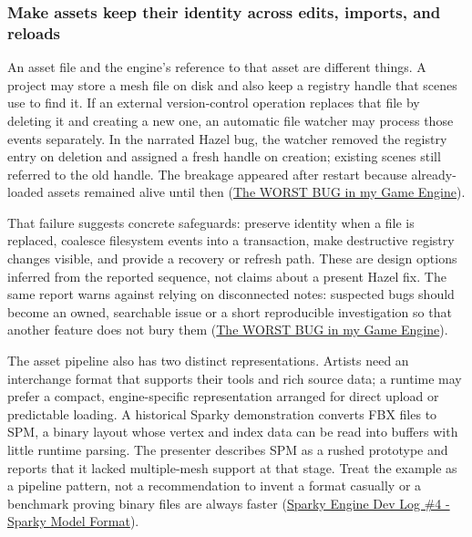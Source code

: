 \subsubsection{Make assets keep their identity across edits, imports, and reloads}\label{06-engine-ii-ch041-make-assets-keep-their-identity-across-edits-imports-and-reloads}

\hypertarget{06-engine-ii-ch041-make-assets-keep-their-identity-across-edits-imports-and-reloads}{}

An asset file and the engine's reference to that asset are different things. A project may store a mesh file on disk and also keep a registry handle that scenes use to find it. If an external version-control operation replaces that file by deleting it and creating a new one, an automatic file watcher may process those events separately. In the narrated Hazel bug, the watcher removed the registry entry on deletion and assigned a fresh handle on creation; existing scenes still referred to the old handle. The breakage appeared after restart because already-loaded assets remained alive until then (\href{https://www.youtube.com/watch?v=x5dy8T9dRPk&t=0m3s}{The WORST BUG in my Game Engine}).

That failure suggests concrete safeguards: preserve identity when a file is replaced, coalesce filesystem events into a transaction, make destructive registry changes visible, and provide a recovery or refresh path. These are design options inferred from the reported sequence, not claims about a present Hazel fix. The same report warns against relying on disconnected notes: suspected bugs should become an owned, searchable issue or a short reproducible investigation so that another feature does not bury them (\href{https://www.youtube.com/watch?v=x5dy8T9dRPk&t=4m55s}{The WORST BUG in my Game Engine}).

The asset pipeline also has two distinct representations. Artists need an interchange format that supports their tools and rich source data; a runtime may prefer a compact, engine-specific representation arranged for direct upload or predictable loading. A historical Sparky demonstration converts FBX files to SPM, a binary layout whose vertex and index data can be read into buffers with little runtime parsing. The presenter describes SPM as a rushed prototype and reports that it lacked multiple-mesh support at that stage. Treat the example as a pipeline pattern, not a recommendation to invent a format casually or a benchmark proving binary files are always faster (\href{https://www.youtube.com/watch?v=EUy8G3uMitI&t=3m47s}{Sparky Engine Dev Log \#4 - Sparky Model Format}).

